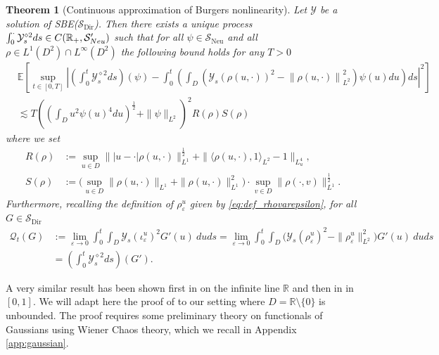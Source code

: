 \documentclass[a4paper, reqno, 12pt]{amsart}
\theoremstyle{plain}
\newtheorem{theorem}[definition]{Theorem}
\theoremstyle{definition}
\newcommand{\R}{\mathbb{R}}
\newcommand{\Sdir}{\mathcal{S}_{\text{Dir}}}
\newcommand{\leander}[1]{\textcolor{red}{(L: #1)}}
\begin{document}
\begin{theorem}[Continuous approximation of Burgers nonlinearity] 
\label{thm:nonlinapprox}
Let $\mathcal Y$ be a solution of SBE($\Sdir$).
Then there exists a unique process $\int_0^{\cdot}\mathcal{Y}^{\diamond 2}_s ds \in \mathcal \mathcal C(\R_+, \mathcal{S}_{Neu}')$ such that for all $\psi \in \mathcal{S}_{\text{Neu}}$ and all $\rho \in L^1(D^2) \cap L^{\infty}(D^2)$ the following bound holds for any $T>0$
\begin{equation}
\label{eq:CABN1}
\begin{split}
    &\mathbb E\left[\sup_{t\in[0,T]}\left|\left( \int_0^t \mathcal{Y}^{\diamond 2}_s ds\right)(\psi) - \int_0^t\left(\int_{D} \left(\mathcal{Y}_s\left(\rho(u,\cdot)\right)^2- \left\|\rho(u,\cdot)\right\|^2_{L^2}\right) \psi (u) du\right) ds\right|^2\right] \\
    & \lesssim T \left(\left(\int_D u^2 \psi(u)^4 du\right)^{\frac{1}{2}} + \|\psi\|_{L^2}\right)^2  R(\rho) S(\rho) 
\end{split}
\end{equation}
where we set
\begin{equation}
\label{def:R-S}
\begin{split}
    R(\rho) & := \sup_{u\in D} \||u-\cdot|\rho(u,\cdot)\|_{L^1}^{\frac{1}{2}} +\|\langle \rho(u,\cdot), 1\rangle_{L^2} - 1\|_{L^4_u}, \\ 
    S(\rho) & :=\Big(\sup_{u\in D}\|\rho(u,\cdot)\|_{L^1} + \|\rho(u,\cdot)\|_{L^1}^2\Big) \cdot \sup_{v\in D}\|\rho( \cdot,v)\|_{L^1}^{\frac{1}{2}}.
\end{split}
\end{equation}
Furthermore, recalling the definition of $\rho_\varepsilon^u$ given by \eqref{eq:def_rhovarepsilon},  for all $G\in \Sdir$ 
\begin{equation}
\label{eq:Qdiamond}
\begin{split}
     \mathcal Q_t(G) &:= \lim_{\varepsilon\to 0}\int_0^t\int_D\mathcal{Y}_s(\iota_{\varepsilon}^u)^2 G'(u) \ du ds = \lim_{\varepsilon\to 0} \int_0^t\int_D \big(\mathcal Y_s(\rho^u_{\varepsilon})^2-\|\rho_{\varepsilon}^u\|_{L^2}^2\big)G'(u) \ duds\\
     &= \left(\int_0^t \mathcal{Y}^{\diamond 2}_s ds\right)(G'). 
\end{split}
\end{equation}
\end{theorem}

A very similar result has been shown first in \cite[Proposition 3.15]{GP18} on the infinite line $\mathbb R$ and then in \cite[Lemma 6.10]{GPS20} in $[0,1]$. We will adapt here the proof of \cite[Lemma 6.10]{GPS20} to our setting where $D = \R\setminus \{0\}$ is unbounded.
The proof requires some preliminary theory on functionals of Gaussians using Wiener Chaos theory, which we recall in Appendix \ref{app:gaussian}.
\end{document}
